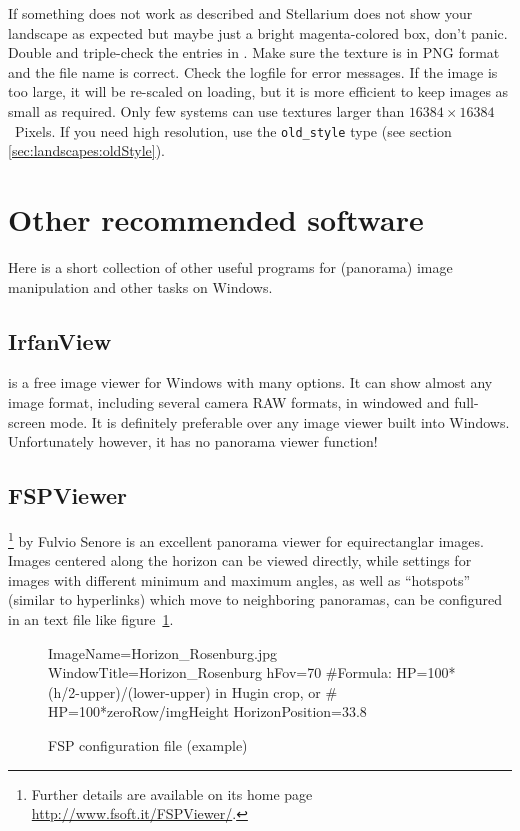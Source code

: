 If something does not work as described and Stellarium does not show
your landscape as expected but maybe just a bright magenta-colored
box, don't panic.  Double and triple-check the entries in
.  Make sure the texture is in
PNG format and the file name is correct. Check the logfile for error
messages. If the image is too large, it will be re-scaled on loading,
but it is more efficient to keep images as small as required. Only few
systems can use textures larger than $16384\times16384$~Pixels. If you
need high resolution, use the \texttt{old\_style} type (see section
\ref{sec:landscapes:oldStyle}).

\section{Other recommended software}
\label{sec:landscapes:otherSoftware}

Here is a short collection of other useful programs for (panorama)
image manipulation and other tasks on Windows.


\subsection{IrfanView}
\label{sec:landscapes:IrfanView}

 is a free image viewer for Windows with many
options. It can show almost any image format, including several camera
RAW formats, in windowed and full-screen mode. It is definitely
preferable over any image viewer built into Windows. Unfortunately
however, it has no panorama viewer function!

\subsection{FSPViewer}
\label{sec:landscapes:FSPViewer}

\footnote{Further details are available on its home
  page \url{http://www.fsoft.it/FSPViewer/}.} by Fulvio
Senore is an excellent panorama viewer for equirectanglar
images. Images centered along the horizon can be viewed directly,
while settings for images with different minimum and maximum angles,
as well as ``hotspots'' (similar to hyperlinks) which move to
neighboring panoramas, can be configured in an  text file
like figure~\ref{fig:FSPexample}.


\begin{figure}[h]\centering
\begin{configfile}
ImageName=Horizon_Rosenburg.jpg
WindowTitle=Horizon_Rosenburg
hFov=70
#Formula: HP=100*(h/2-upper)/(lower-upper) in Hugin crop, or
#         HP=100*zeroRow/imgHeight
HorizonPosition=33.8
\end{configfile}
\caption{FSP configuration file (example)}
\label{fig:FSPexample}
\end{figure}

